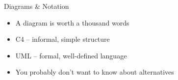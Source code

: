 \documentclass{slide}
\begin{document}
\begin{frame}{Diagrams \& Notation}

\Large{
\begin{itemize}
    \item<1-> A  diagram is worth a thousand words
    \vspace{5mm}
    \item<2-> C4 -- informal, simple structure \cite{brown2022c4}
    \vspace{1mm}
    \item<2-> UML -- formal, well-defined language \cite{uml}
    \vspace{2mm}
    \item<2-> You probably don't want to know about alternatives
\end{itemize}
}

\end{frame}




\end{document}
